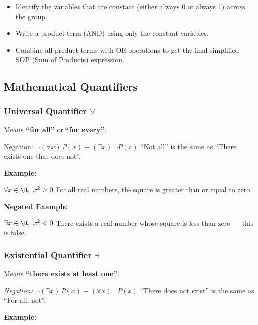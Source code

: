 \begin{enumerate}
		  \begin{itemize}

			\item Identify the variables that are constant (either always 0 or always 1) across the group.

			\item Write a product term (AND) using only the constant variables.

			\item Combine all product terms with OR operations to get the final simplified SOP (Sum of 
				  Products) expression.

		\end{itemize}

	\end{enumerate}

\subsection{Mathematical Quantifiers}

\subsubsection{Universal Quantifier \texorpdfstring{\(\forall\)}{}}  

Means \textbf{``for all''} or \textbf{``for every''}.

{Negation:} \(\neg (\forall x)\,P(x) \equiv (\exists x)\, \neg P(x)\) ``Not all'' is the same as 
``There exists one that does not''.

\textbf{Example:} 

\(\forall x \in \R,\ x^2 \geq 0\) For all real numbers, the square is greater than or equal to zero.

\textbf{Negated Example:} 

\(\exists x \in \R,\ x^2 < 0\) There exists a real number whose square is less than zero — this is 
false.

\subsubsection{Existential Quantifier \texorpdfstring{\(\exists\)}{}}  
	
Means \textbf{``there exists at least one''}.
 		
\emph{Negation:}  \(\neg (\exists x)\,P(x) \equiv (\forall x)\, \neg P(x)\) ``There does not exist'' is 
the same as ``For all, not''.

\textbf{Example:} 

